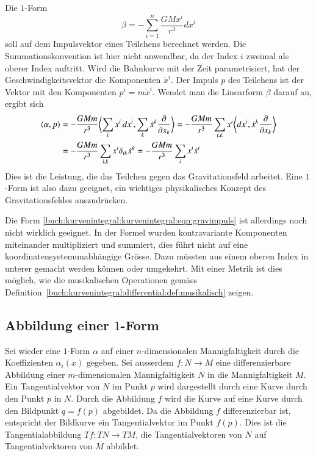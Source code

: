 \begin{beispiel}
Die $1$-Form
\[
\beta
=
-
\sum_{i=1}^n
\frac{GMx^i}{r^3}
dx^i
\]
soll auf dem Impulsvektor eines Teilchens berechnet werden.
Die Summationskonvention ist hier nicht anwendbar, da der Index $i$ zweimal
als oberer Index auftritt.
%
Wird die Bahnkurve mit der Zeit parametrisiert, hat der Geschwindigkeitsvektor
die Komponenten $\dot{x}^i$.
Der Impuls $p$ des Teilchens ist der Vektor mit den Komponenten
$p^i=m\dot{x}^i$.
Wendet man die Linearform $\beta$ darauf an, ergibt sich
\begin{align}
\langle \alpha, p\rangle
&=
-
\frac{GMm}{r^3}
\biggl\langle \sum_i x^i\,dx^i, \sum_k\dot{x}^k\frac{\partial}{\partial x_k}\biggr\rangle
=
-
\frac{GMm}{r^3}
\sum_{i,k} x^i \biggl\langle dx^i,\dot{x}^k\frac{\partial}{\partial x_k}\biggr\rangle
\notag
\\
&=
-
\frac{GMm}{r^3}
\sum_{i,k}
x^i \delta_{ik} \dot{x}^k
=
-\frac{GMm}{r^3}
\sum_i x^i\dot{x}^i
\label{buch:kurvenintegral:kurvenintegral:eqn:gravimpuls}
\end{align}
Dies ist die Leistung, die das Teilchen gegen das Gravitationsfeld 
arbeitet.
Eine $1$-Form ist also dazu geeignet, ein wichtiges physikalisches Konzept
des Gravitationsfeldes auszudrücken.
\end{beispiel}

Die Form
\eqref{buch:kurvenintegral:kurvenintegral:eqn:gravimpuls}
ist allerdings noch nicht wirklich geeignet.
In der Formel wurden kontravariante Komponenten miteinander multipliziert
und summiert, dies führt nicht auf eine koordinatensystemunabhängige
Grösse.
Dazu müssten aus einem oberen Index in unterer gemacht werden können
oder umgekehrt.
Mit einer Metrik ist dies möglich, wie die musikalischen Operationen
gemäss
Definition~\ref{buch:kurvenintegral:differential:def:musikalisch}
zeigen.

%
%
\subsection{Abbildung einer $1$-Form}
Sei wieder eine $1$-Form $\alpha$ auf einer $n$-dimensionalen Mannigfaltigkeit
durch die Koeffizienten $\alpha_i(x)$ gegeben.
Sei ausserdem $f\colon N\to M$ eine differenzierbare Abbildung einer
$m$-dimensionalen Mannigfaltigkeit $N$ in die Mannigfaltigkeit $M$.
Ein Tangentialvektor von $N$ im Punkt $p$ wird dargestellt durch eine
Kurve durch den Punkt $p$ in $N$.
Durch die Abbildung $f$ wird die Kurve auf eine Kurve durch den Bildpunkt
$q=f(p)$ abgebildet.
Da die Abbildung $f$ differenzierbar ist, entspricht der Bildkurve 
ein Tangentialvektor im Punkt $f(p)$.
Dies ist die Tangentialabbildung $Tf\colon TN\to TM$, die Tangentialvektoren
von $N$ auf Tangentialvektoren von $M$ abbildet.


